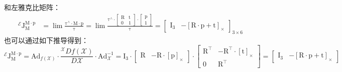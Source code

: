 \documentclass[12pt, onecolumn]{article}
\newcommand\skewmat[1]{\left[ #1 \right]_\times}
\newcommand\liehat[1]{#1^{\land}}
\newcommand\bsm[1]{\boldsymbol{\mathrm{#1}}}
\begin{document}
	和左雅克比矩阵：
	\begin{equation}
	\begin{aligned}
	^\mathcal{E}\bsm{J}_{\bsm{M}}^{\bsm{M}\cdot\bsm{p}}&=
	\lim\frac{\liehat{\bsm{\tau}}  \cdot\bsm{M}\cdot\bsm{p}}{\bsm{\tau}}
		=\lim\frac{\liehat{\bsm{\tau}}  \cdot	\begin{bmatrix}
		\bsm{R}&\bsm{t}\\\bsm{0}&1
		\end{bmatrix}\cdot\begin{bmatrix}
			\bsm{p}\\1
			\end{bmatrix}}{\bsm{\tau}}
		=\begin{bmatrix}
		\bsm{I}_3&-\skewmat{\bsm{R}\cdot\bsm{p}+\bsm{t}}
		\end{bmatrix}_{3\times 6}
	\end{aligned}
	\end{equation}
	也可以通过如下推导得到：
	\begin{equation}
	^\mathcal{E}\bsm{J}_{\bsm{M}}^{\bsm{M}\cdot\bsm{p}}=
	\bsm{Ad}_{f(\mathcal{X})}\cdot\frac{{^\mathcal{X}Df(\mathcal{X})}}{D\mathcal{X}}
		\cdot\bsm{Ad}_{\mathcal{X}}^{-1}
		=\bsm{I}_3\cdot
		\begin{bmatrix}
			\bsm{R}&-\bsm{R}\cdot\skewmat{\bsm{p}}
			\end{bmatrix}
		 \cdot\begin{bmatrix}
		 					\bsm{R}^\top&-\bsm{R}^\top\cdot\skewmat{\bsm{t}}\\
		 					\bsm{0}&\bsm{R}^\top
		 					\end{bmatrix}=
		\begin{bmatrix}
		\bsm{I}_3&-\skewmat{\bsm{R}\cdot\bsm{p}+\bsm{t}}
		\end{bmatrix}
	\end{equation}
	
	
\end{document}
